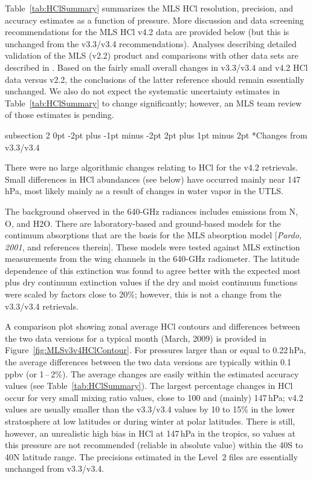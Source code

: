 \documentclass[11pt,draft]{report}
\makeatletter
\renewcommand{\subsection}{\@startsection%
  {subsection}%
  {2}%
  {0pt}%
  {-2pt plus -1pt minus -2pt}%
  {2pt plus 1pt minus 2pt}%
  {\large\sffamily\fontseries{sb}\selectfont\flushleft\color{SectionColor}\figureversion{tabular}}}%
\makeatother
\begin{document}
Table~\ref{tab:HClSummary} summarizes the MLS HCl resolution, precision,
and accuracy estimates as a function of pressure.  More discussion and
data screening recommendations for the MLS HCl v4.2 data are provided
below (but this is unchanged from the v3.3/v3.4 recommendations).
Analyses describing detailed validation of the MLS (v2.2) product and
comparisons with other data sets are described in
\citet{FroidevauxEtal08HCl}.  Based on the fairly small overall changes
in v3.3/v3.4 and v4.2 HCl data versus v2.2, the conclusions of the
latter reference should remain essentially unchanged. We also do not
expect the systematic uncertainty estimates in
Table~\ref{tab:HClSummary} to change significantly; however, an MLS team
review of those estimates is pending.

\subsection*{Changes from  v3.3/v3.4}

There were no large algorithmic changes relating to HCl for the v4.2
retrievals. Small differences in HCl abundances (see below) have
occurred mainly near 147\,hPa, most likely mainly as a result of changes
in water vapor in the UTLS.

The background observed in the 640-GHz radiances includes emissions from
N, O, and H\cs2O.  There are laboratory-based and ground-based
models for the continuum absorptions that are the basis for the MLS
absorption model [{\it Pardo, 2001}, and references therein].  These
models were tested against MLS extinction measurements from the wing
channels in the 640-GHz radiometer.  The latitude dependence of this
extinction was found to agree better with the expected most plus dry
continuum extinction values if the dry and moist continuum functions
were scaled by factors close to 20\%; however, this is not a change
from the v3.3/v3.4 retrievals.

A comparison plot showing zonal average HCl contours and differences
between the two data versions for a typical month (March, 2009) is
provided in Figure~\ref{fig:MLSv3v4HClContour}.  For pressures larger
than or equal to 0.22\,hPa, the average differences between the two data
versions are typically within 0.1\,ppbv (or 1\,--\,2\%).  The average
changes are easily within the estimated accuracy values (see
Table~\ref{tab:HClSummary}).  The largest percentage changes in HCl
occur for very small mixing ratio values, close to 100 and (mainly)
147\,hPa; v4.2 values are usually smaller than the v3.3/v3.4 values by
10 to 15\% in the lower stratosphere at low latitudes or during winter
at polar latitudes.  There is still, however, an unrealistic high bias
in HCl at 147\,hPa in the tropics, so values at this pressure are not
recommended (reliable in absolute value) within the 40\degsym S to
40\degsym N latitude range. The precisions estimated in the Level~2
files are essentially unchanged from v3.3/v3.4.
\end{document}
